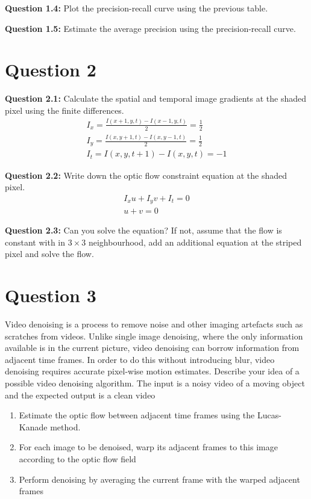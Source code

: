 \documentclass[12pt]{article}
\begin{document}
\pagebreak

\textbf{Question 1.4:} Plot the precision-recall curve using the previous table.



\textbf{Question 1.5:} Estimate the average precision using the precision-recall curve.

\section*{Question 2}

\textbf{Question 2.1:} Calculate the spatial and temporal image gradients at the shaded pixel using the finite
differences.
\begin{gather*}
    I_x = \frac{I(x+1, y, t) - I(x-1, y, t)}{2} = \frac{1}{2} \\ 
    I_y = \frac{I(x, y+1, t) - I(x, y-1, t)}{2} = \frac{1}{2} \\
    I_t = I(x,y,t+1) - I(x,y,t) = -1
\end{gather*}

\textbf{Question 2.2:} Write down the optic flow constraint equation at the shaded pixel.
\begin{gather*}
    I_x u + I_y v + I_t = 0 \\ 
    u + v = 0
\end{gather*}

\textbf{Question 2.3:} Can you solve the equation? If not, assume that the flow is constant with in $3 \times 3$
neighbourhood, add an additional equation at the striped pixel and solve the flow.

\section*{Question 3} 

Video denoising is a process to remove noise and other imaging artefacts such as scratches from
videos. Unlike single image denoising, where the only information available is in the current
picture, video denoising can borrow information from adjacent time frames. In order to do this
without introducing blur, video denoising requires accurate pixel-wise motion estimates. Describe
your idea of a possible video denoising algorithm. The input is a noisy video of a moving object
and the expected output is a clean video

\begin{enumerate}
    \item Estimate the optic flow between adjacent time frames using the Lucas-Kanade method.
    \item For each image to be denoised, warp its adjacent frames to this image according to the optic
    flow field
    \item Perform denoising by averaging the current frame with the warped adjacent frames
\end{enumerate}
\end{document}
